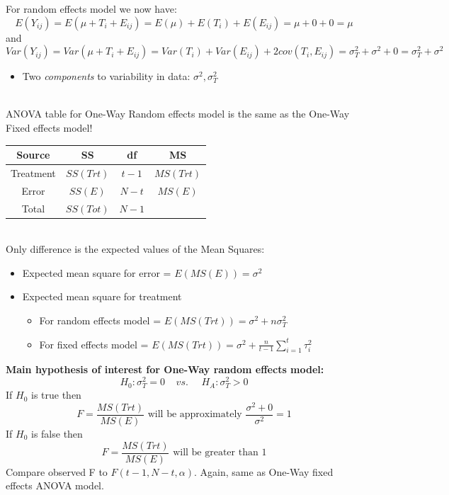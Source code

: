 \newpage 

For random effects model we now have:
$$E(Y_{ij})=E(\mu+T_i+E_{ij})=E(\mu)+E(T_i)+E(E_{ij})=\mu + 0 + 0 =\mu$$
and
$$Var(Y_{ij})=Var(\mu+T_i+E_{ij})=Var(T_i)+Var(E_{ij})+2cov(T_i,E_{ij})=\sigma^2_T+\sigma^2+0=\sigma^2_T+\sigma^2$$
\begin{itemize}
\item Two {\em components} to variability in data: $\sigma^2, \sigma_T^2$
\end{itemize}~\\

ANOVA table for One-Way Random effects model is the same as the One-Way Fixed effects model!
\begin{center}
\begin{tabular}{cccc}
Source & SS & df & MS  \\ \hline
Treatment & $SS(Trt)$ & $t-1$ & $MS(Trt)$  \\
Error & $SS(E)$ & $N-t$ & $MS(E)$  \\
Total & $SS(Tot)$ & $N-1$ & \\ \hline
\end{tabular}
\end{center}
~\\
Only difference is the expected values of the Mean Squares:
\begin{itemize}
\item Expected mean square for error = $E(MS(E))=\sigma^2$
\item Expected mean square for treatment 
\begin{itemize}
\item For random effects model = $E(MS(Trt))=\sigma^2+n\sigma^2_T$\\
\item For fixed effects model = $E(MS(Trt))=\sigma^2+\frac{n}{t-1}\sum_{i=1}^{t}\tau_i^2$\\
\end{itemize}
\end{itemize}


\textbf{Main hypothesis of interest for One-Way random effects model:}
$$H_0:\sigma^2_T=0~~~~~vs.~~~~~~H_A:\sigma^2_T>0$$
If $H_0$ is true then
$$F=\frac{MS(Trt)}{MS(E)}\mbox{ will be approximately }\frac{\sigma^2+0}{\sigma^2}=1$$
If $H_0$ is false then
$$F=\frac{MS(Trt)}{MS(E)}\mbox{ will be greater than }1$$
Compare observed F to $F(t-1,N-t,\alpha)$.  Again, same as One-Way fixed effects ANOVA model.\\~\\~\\

